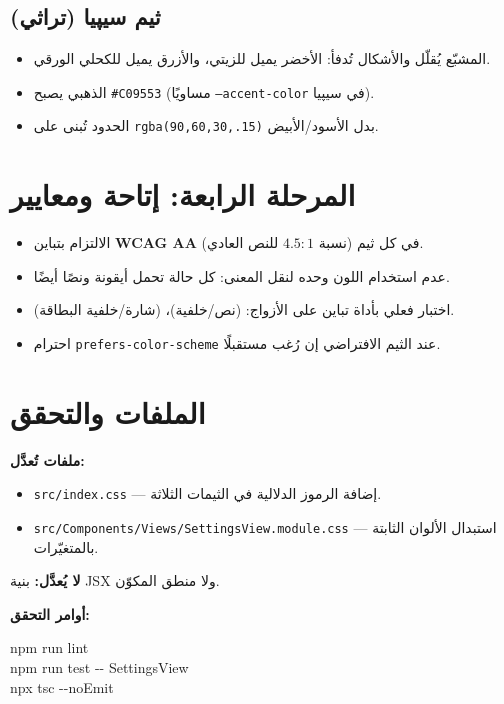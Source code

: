 \documentclass[11pt]{article}
\begin{document}
\subsection*{ثيم سيپيا (تراثي)}
\begin{itemize}
  \item المشبّع يُقلّل والأشكال تُدفأ: الأخضر يميل للزيتي، والأزرق يميل للكحلي الورقي.
  \item الذهبي يصبح \texttt{\#C09553} (مساويًا \texttt{--accent-color} في سيپيا).
  \item الحدود تُبنى على \texttt{rgba(90,60,30,.15)} بدل الأسود/الأبيض.
\end{itemize}

\section{المرحلة الرابعة: إتاحة ومعايير}

\begin{itemize}
  \item الالتزام بتباين \textbf{WCAG AA} (نسبة $4.5{:}1$ للنص العادي) في كل ثيم.
  \item عدم استخدام اللون وحده لنقل المعنى: كل حالة تحمل أيقونة ونصًا أيضًا.
  \item اختبار فعلي بأداة تباين على الأزواج: (نص/خلفية)، (شارة/خلفية البطاقة).
  \item احترام \texttt{prefers-color-scheme} عند الثيم الافتراضي إن رُغب مستقبلًا.
\end{itemize}

\section{الملفات والتحقق}

\textbf{ملفات تُعدَّل:}
\begin{itemize}
  \item \texttt{src/index.css} — إضافة الرموز الدلالية في الثيمات الثلاثة.
  \item \texttt{src/Components/Views/SettingsView.module.css} — استبدال الألوان الثابتة بالمتغيّرات.
\end{itemize}

\textbf{لا يُعدَّل:} بنية JSX ولا منطق المكوّن.

\vspace{6pt}
\textbf{أوامر التحقق:}
\begin{codebox}
{\ttfamily\small\raggedleft
npm run lint\\
npm run test -{}- SettingsView\\
npx tsc -{}-noEmit
}
\end{codebox}
\end{document}
